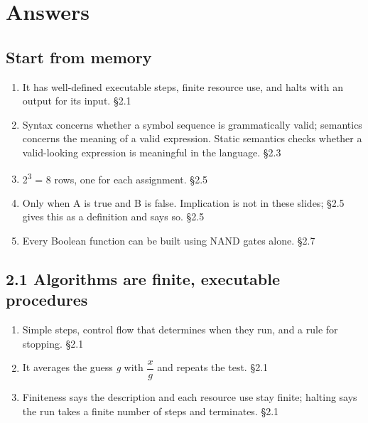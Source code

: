 \documentclass[11pt]{article}
\begin{document}
\section{Answers}
\begin{keepsection}\subsection{Start from memory}

\begin{enumerate}
\item It has well-defined executable steps, finite resource use, and halts with an output for its input. \hfill{\small\color{FAUblue}§2.1}
\item Syntax concerns whether a symbol sequence is grammatically valid; semantics concerns the meaning of a valid expression. Static semantics checks whether a valid-looking expression is meaningful in the language. \hfill{\small\color{FAUblue}§2.3}
\item 2\textsuperscript{3} = 8 rows, one for each assignment. \hfill{\small\color{FAUblue}§2.5}
\item Only when A is true and B is false. Implication is not in these slides; §2.5 gives this as a definition and says so. \hfill{\small\color{FAUblue}§2.5}
\item Every Boolean function can be built using NAND gates alone. \hfill{\small\color{FAUblue}§2.7}
\end{enumerate}

\end{keepsection}
\begin{keepsection}\subsection{2.1 Algorithms are finite, executable procedures}

\begin{enumerate}
\item Simple steps, control flow that determines when they run, and a rule for stopping. \hfill{\small\color{FAUblue}§2.1}
\item It averages the guess \textit{g} with {\small\ensuremath{\dfrac{{x}}{{g}}}} and repeats the test. \hfill{\small\color{FAUblue}§2.1}
\item Finiteness says the description and each resource use stay finite; halting says the run takes a finite number of steps and terminates. \hfill{\small\color{FAUblue}§2.1}
\end{enumerate}

\end{keepsection}
\end{document}
